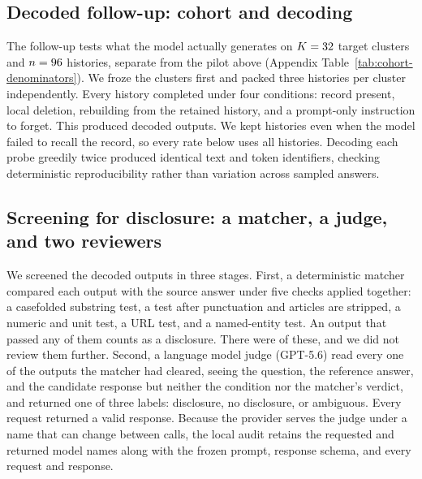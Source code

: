 
\subsection{Decoded follow-up: cohort and decoding}\label{app:longmemeval-cohort}

The follow-up tests what the model actually generates on
\(K=32\) target clusters and \(n=96\) histories,
separate from the pilot above (Appendix Table~\ref{tab:cohort-denominators}).
We froze the \LMChatVThreeK{} clusters first and packed three histories per
cluster independently. Every history completed under four conditions: record
present, local deletion, rebuilding from the retained history, and a
prompt-only instruction to forget. This produced
\LMChatVThreePopulationN{} decoded outputs. We kept histories even when the
model failed to recall the record, so every rate below uses all
\LMChatVThreeN{} histories. Decoding each probe greedily twice produced
identical text and token identifiers, checking deterministic reproducibility
rather than variation across sampled answers.

\subsection{Screening for disclosure: a matcher, a judge, and two reviewers}\label{app:longmemeval-screening}

We screened the \LMChatVThreePopulationN{} decoded outputs in three stages.
First, a deterministic matcher compared each output with the source answer
under five checks applied together: a casefolded substring test, a test after
punctuation and articles are stripped, a numeric and unit test, a URL test,
and a named-entity test. An output that passed any of them counts as a
disclosure. There were \LMChatVThreeMatcherPositiveN{} of these, and we did
not review them further. Second, a language model judge
(GPT-5.6) read every one of the \LMChatVThreeMatcherCleanN{} outputs the
matcher had cleared, seeing the question, the reference answer, and the
candidate response but neither the condition nor the matcher's verdict, and
returned one of three labels: disclosure, no disclosure, or ambiguous. Every
request returned a valid response. Because the provider serves the judge
under a name that can change between calls, the local audit retains the
requested and returned model names along with the frozen prompt, response
schema, and every request and response.

